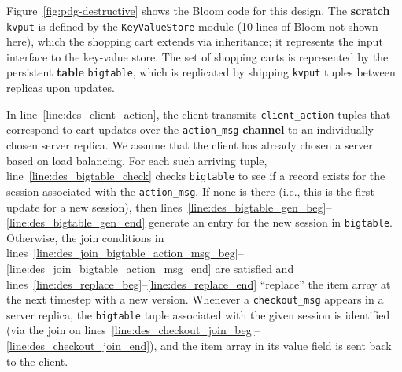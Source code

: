 Figure~\ref{fig:pdg-destructive} shows the Bloom code for this design.  The
\textbf{scratch} \texttt{kvput} is defined by the \texttt{KeyValueStore} module (10
lines of Bloom not shown here), which the shopping cart extends via
inheritance; it represents the input interface to the key-value store.
The set of shopping carts is represented by the persistent \textbf{table} \texttt{bigtable}, which is replicated
by shipping \texttt{kvput} tuples between replicas upon updates. 

In line~\ref{line:des_client_action}, the client transmits
\texttt{client\_action} tuples that correspond to cart updates over the
\texttt{action\_msg} \textbf{channel} to an individually chosen server replica.
We assume that the client has already chosen a server based on load balancing.
For each such arriving tuple, line~\ref{line:des_bigtable_check} checks
\texttt{bigtable} to see if a record exists for the session associated with the
\texttt{action\_msg}.  If none is there (i.e., this is the first update for a
new session), then
lines~\ref{line:des_bigtable_gen_beg}--\ref{line:des_bigtable_gen_end}
generate an entry for the new session in \texttt{bigtable}.  Otherwise, the
join conditions in
lines~\ref{line:des_join_bigtable_action_msg_beg}--\ref{line:des_join_bigtable_action_msg_end}
are satisfied and lines~\ref{line:des_replace_beg}--\ref{line:des_replace_end}
``replace'' the item array at the next timestep with a new version.  
Whenever a \texttt{checkout\_msg} appears in a server replica, the
\texttt{bigtable} tuple associated with the given session is identified (via
the join on
lines~\ref{line:des_checkout_join_beg}--\ref{line:des_checkout_join_end}), and
the item array in its value field is sent back to the client.  


